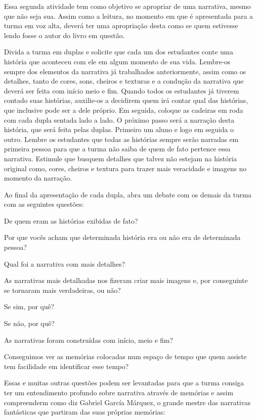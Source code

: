 \documentclass[11pt]{extarticle}
\begin{document}
Essa segunda atividade tem como objetivo se apropriar de uma narrativa, mesmo que não seja sua. Assim como a leitura, no momento em que é apresentada para a turma em voz alta, deverá ter uma apropriação desta como se quem estivesse lendo fosse o autor do livro em questão.

Divida a turma em duplas e solicite que cada um dos estudantes conte uma história que aconteceu com ele em algum momento de sua vida. Lembre-os sempre dos elementos da narrativa já trabalhados anteriormente, assim como os detalhes, tanto de cores, sons, cheiros e texturas e a condução da narrativa que deverá ser feita com início meio e fim. Quando todos os estudantes já tiverem contado suas histórias, auxilie-os a decidirem quem irá contar qual das histórias, que inclusive pode ser a dele próprio.  Em seguida, coloque as cadeiras em roda com cada dupla sentada lado a lado. O próximo passo será a narração desta história, que será feita pelas duplas. Primeiro um aluno e logo em seguida o outro. Lembre os estudantes que todas as histórias sempre serão narradas em primeira pessoa para que a turma não saiba de quem de fato pertence essa narrativa. Estimule que busquem detalhes que talvez não estejam na história original como, cores, cheiros e textura para trazer mais veracidade e imagens no momento da narração. 


Ao final da apresentação de cada dupla, abra um debate com os demais da turma com as seguintes questões:

\item De quem eram as histórias exibidas de fato?
\item Por que vocês acham que determinada história era ou não era de determinada pessoa?
\item Qual foi a narrativa com mais detalhes?
\item As narrativas mais detalhadas nos fizeram criar mais imagens e, por conseguinte se tornaram mais verdadeiras, ou não?
\item Se sim, por quê? 
\item Se não, por quê?
\item As narrativas foram construídas com início, meio e fim?
\item Conseguimos ver as memórias colocadas num espaço de tempo que quem assiste tem facilidade em identificar esse tempo?

Essas e muitas outras questões podem ser levantadas para que a turma consiga ter um entendimento profundo sobre narrativa através de memórias e assim compreenderm como diz Gabriel García Márquez, o grande mestre das narrativas fantásticas que partiram das suas próprias memórias:
\end{document}
